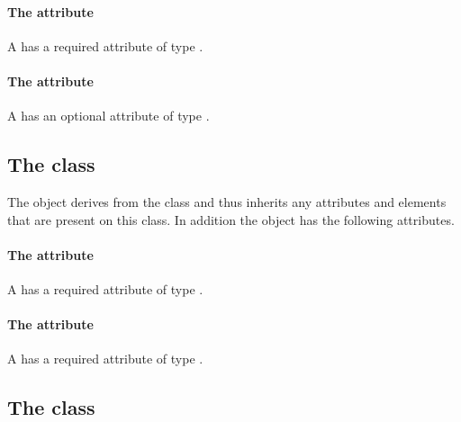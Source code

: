 \paragraph{The \fixttspace{} attribute}

A \GradientBase has a required attribute  of type
.

\paragraph{The \fixttspace{} attribute}

A \GradientBase has an optional attribute  of type
\GradientSpreadMethod.

\subsection{The  class}
\label{gradientstop-class}


The \GradientStop object derives from the  class and thus
inherits any attributes and elements that are present on this class.
In addition the \GradientStop object has the following attributes.

\paragraph{The \fixttspace{} attribute}

A \GradientStop has a required attribute  of type
\RelAbsVector.

\paragraph{The \fixttspace{} attribute}

A \GradientStop has a required attribute  of type
.

\subsection{The  class}
\label{rendergroup-class}


